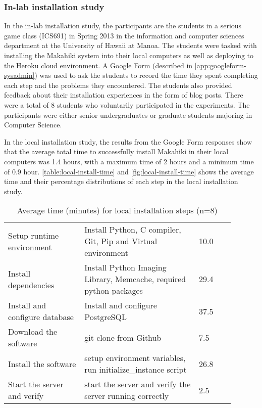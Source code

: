 \subsubsection{In-lab installation study}
\label{sec:sysadmin-in-lab-result}

In the in-lab installation study, the participants are the students in a serious game class (ICS691) in Spring 2013 in the information and computer sciences department at the University of Hawaii at Manoa. The students were tasked with installing the Makahiki system into their local computers as well as deploying to the Heroku cloud environment. A Google Form (described in \autoref{app:googleform-sysadmin}) was used to ask the students to record the time they spent completing each step and the problems they encountered. The students also provided feedback about their installation experiences in the form of blog posts. There were a total of 8 students who voluntarily participated in the experiments.  The participants were either senior undergraduates or graduate students majoring in Computer Science. 

In the local installation study, the results from the Google Form responses show that the average total time to successfully install Makahiki in their local computers was 1.4 hours, with a maximum time of 2 hours and a minimum time of 0.9 hour. \autoref{table:local-install-time} and \autoref{fig:local-install-time} shows the average time and their percentage distributions of each step in the local installation study.

\begin{table}[ht!]
  \centering
  \begin{tabular}{|p{0.3\linewidth}|P{0.45\linewidth}|P{0.14\linewidth}|}
    \hline
     &  &  \\
    \hline
    Setup runtime environment & Install Python, C compiler, Git, Pip and Virtual environment & 10.0 \\
    \hline
    Install dependencies & Install Python Imaging Library, Memcache, required python packages & 29.4 \\
    \hline
    Install and configure database & Install and configure PostgreSQL & 37.5 \\
    \hline
    Download the software & git clone from Github & 7.5 \\
    \hline
    Install the software & setup environment variables, run initialize\_instance script & 26.8 \\
    \hline
    Start the server and verify & start the server and verify the server running correctly & 2.5 \\
   \hline
    \end{tabular}
  \caption{Average time (minutes) for local installation steps (n=8)}
  \label{table:local-install-time}
\end{table}
    
